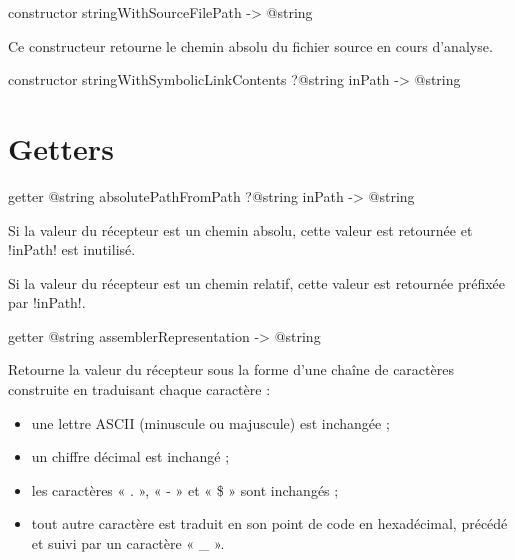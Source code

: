 
\begin{galgas4box}
constructor stringWithSourceFilePath -> @string
\end{galgas4box}

Ce constructeur retourne le chemin absolu du fichier source en cours d'analyse.







\begin{galgas4box}
constructor stringWithSymbolicLinkContents ?@string inPath -> @string
\end{galgas4box}



















\section{Getters}



\begin{galgas4box}
getter @string absolutePathFromPath ?@string inPath -> @string
\end{galgas4box}

Si la valeur du récepteur est un chemin absolu, cette valeur est retournée et \ggsq!inPath! est inutilisé.

Si la valeur du récepteur est un chemin relatif, cette valeur est retournée préfixée par \ggsq!inPath!.





\begin{galgas4box}
getter @string assemblerRepresentation -> @string
\end{galgas4box}

Retourne la valeur du récepteur sous la forme d'une chaîne de caractères construite en traduisant chaque caractère :
\begin{itemize}
\item une lettre ASCII (minuscule ou majuscule) est inchangée ;
\item un chiffre décimal est inchangé ;
\item les caractères « . »,  « - » et  « \$ » sont inchangés ;
\item tout autre caractère est traduit en son point de code en hexadécimal, précédé et suivi par un caractère « \_ ».
\end{itemize}

